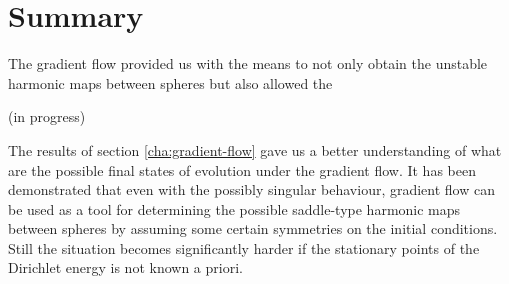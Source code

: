 \chapter{Summary}
\label{cha:summary}


The gradient flow provided us with the means to not only obtain the
unstable harmonic maps between spheres but also allowed the

(in progress)


The results of section \ref{cha:gradient-flow} gave us a
better understanding of what are the possible final states of
evolution under the gradient flow. It has been demonstrated that even
with the possibly singular behaviour, gradient flow can be used as a
tool for determining the possible saddle-type harmonic maps between
spheres by assuming some certain symmetries on the initial
conditions. Still the situation becomes significantly harder if the
stationary points of the
Dirichlet energy is not known a priori.\\



